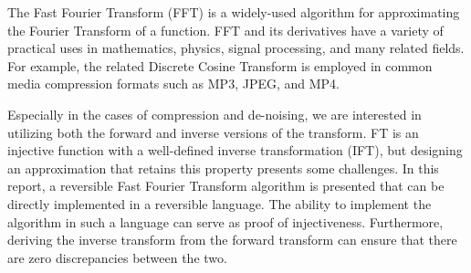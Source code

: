 The Fast Fourier Transform (FFT) is a widely-used algorithm for approximating the
Fourier Transform of a function.
FFT and its derivatives have a variety of practical uses in
mathematics, physics, signal processing, and many related fields.
For example,
the related Discrete Cosine Transform is employed in common media compression formats such as
MP3, JPEG, and MP4.

Especially in the cases of compression and de-noising,
we are interested in utilizing both the forward and inverse versions of the transform.
FT is an injective function with a well-defined inverse transformation (IFT),
but designing an approximation that retains this property presents some challenges.
%
In this report,
a reversible Fast Fourier Transform algorithm is presented
that can be directly implemented in a reversible language.
The ability to implement the algorithm in such a language can serve as proof of injectiveness.
Furthermore, deriving the inverse transform from the forward transform can ensure
that there are zero discrepancies between the two.
